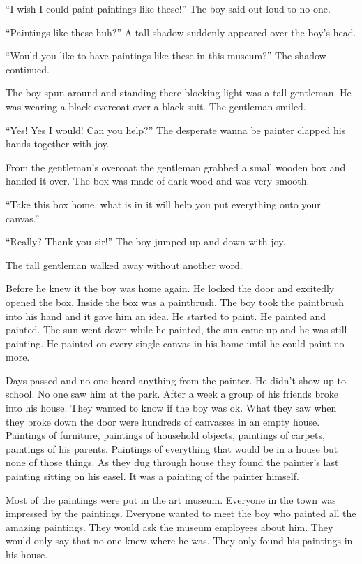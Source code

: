 ``I wish I could paint paintings like these!'' The boy said out loud
to no one.

``Paintings like these huh?'' A tall shadow suddenly appeared over
the boy's head.

``Would you like to have paintings like these in this museum?'' The
shadow continued.

The boy spun around and standing there blocking light was a tall
gentleman. He was wearing a black overcoat over a black suit. The
gentleman smiled.

``Yes! Yes I would! Can you help?'' The desperate wanna be painter
clapped his hands together with joy.

From the gentleman's overcoat the gentleman grabbed a small wooden
box and handed it over. The box was made of dark wood and was very
smooth.

``Take this box home, what is in it will help you put everything
onto your canvas.''

``Really? Thank you sir!'' The boy jumped up and down
with joy.

The tall gentleman walked away without another word.



Before he knew it the boy was home again. He locked the door and
excitedly opened the box. Inside the box was a paintbrush. The boy
took the paintbrush into his hand and it gave him an idea. He
started to paint. He painted and painted. The sun went down while
he painted, the sun came up and he was still painting. He painted
on every single canvas in his home until he could paint no
more.



Days passed and no one heard anything from the painter. He didn't
show up to school. No one saw him at the park. After a week a group
of his friends broke into his house. They wanted to know if the boy
was ok. What they saw when they broke down the door were hundreds
of canvasses in an empty house. Paintings of furniture, paintings
of household objects, paintings of carpets, paintings of his
parents. Paintings of everything that would be in a house but none
of those things. As they dug through house they found the painter's
last painting sitting on his easel. It was a painting of the
painter himself.



Most of the paintings were put in the art museum. Everyone in the
town was impressed by the paintings. Everyone wanted to meet the
boy who painted all the amazing paintings. They would ask the
museum employees about him. They would only say that no one knew
where he was. They only found his paintings in his house. 

